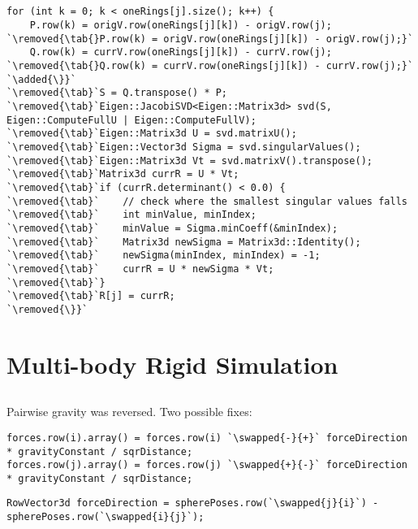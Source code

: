 \documentclass[12pt, a4paper]{article}
\newcommand{\removed}[1]{\colorbox{pink}{\vphantom{A}#1}}
\newcommand{\added}[1]{\colorbox{lime}{\vphantom{A}#1}}
\newcommand{\swapped}[2]{\removed{#1}\added{#2}}
\newcommand{\inline}[1]{\fbox{\texttt{#1}}}
\newcommand{\tab}[0]{\space\space\space\space}
\begin{document}
    \subsection{}
        \begin{lstlisting}[caption={Lines 3 and 5 have been removed. The \inline{for} loop is now closed 
            on line 6 instead of 22. Lines 7 to 21 are no longer indented.}, label={lst:c1}]
for (int k = 0; k < oneRings[j].size(); k++) {
    P.row(k) = origV.row(oneRings[j][k]) - origV.row(j);
`\removed{\tab{}P.row(k) = origV.row(oneRings[j][k]) - origV.row(j);}`
    Q.row(k) = currV.row(oneRings[j][k]) - currV.row(j);
`\removed{\tab{}Q.row(k) = currV.row(oneRings[j][k]) - currV.row(j);}`
`\added{\}}`
`\removed{\tab}`S = Q.transpose() * P;
`\removed{\tab}`Eigen::JacobiSVD<Eigen::Matrix3d> svd(S, Eigen::ComputeFullU | Eigen::ComputeFullV);
`\removed{\tab}`Eigen::Matrix3d U = svd.matrixU();
`\removed{\tab}`Eigen::Vector3d Sigma = svd.singularValues();
`\removed{\tab}`Eigen::Matrix3d Vt = svd.matrixV().transpose();
`\removed{\tab}`Matrix3d currR = U * Vt;
`\removed{\tab}`if (currR.determinant() < 0.0) {
`\removed{\tab}`    // check where the smallest singular values falls
`\removed{\tab}`    int minValue, minIndex;
`\removed{\tab}`    minValue = Sigma.minCoeff(&minIndex);
`\removed{\tab}`    Matrix3d newSigma = Matrix3d::Identity();
`\removed{\tab}`    newSigma(minIndex, minIndex) = -1;
`\removed{\tab}`    currR = U * newSigma * Vt;
`\removed{\tab}`}
`\removed{\tab}`R[j] = currR;
`\removed{\}}`
            \end{lstlisting}

\section{Multi-body Rigid Simulation}
    \subsection{}
        Pairwise gravity was reversed.
        Two possible fixes:
        \begin{lstlisting}[caption={The \inline{+} and \inline{-} have been swapped.}, label={lst:d1}]
forces.row(i).array() = forces.row(i) `\swapped{-}{+}` forceDirection * gravityConstant / sqrDistance;
forces.row(j).array() = forces.row(j) `\swapped{+}{-}` forceDirection * gravityConstant / sqrDistance;
\end{lstlisting}
        \begin{lstlisting}[caption={The \inline{i} and \inline{j} have been swapped.}, label={lst:e1}]
RowVector3d forceDirection = spherePoses.row(`\swapped{j}{i}`) - spherePoses.row(`\swapped{i}{j}`);
\end{lstlisting}
\end{document}
